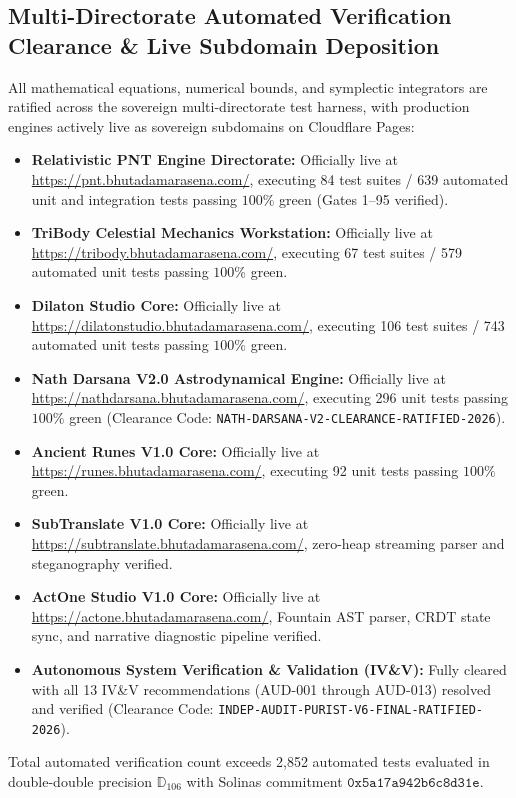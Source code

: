 \documentclass[11pt,a4paper,reqno]{article}
\theoremstyle{plain}
\theoremstyle{definition}
\theoremstyle{remark}
\numberwithin{equation}{section}
\newcommand{\Ddd}{\mathbb{D}_{106}}
\begin{document}
\subsection*{Multi-Directorate Automated Verification Clearance \& Live Subdomain Deposition}
All mathematical equations, numerical bounds, and symplectic integrators are ratified across the sovereign multi-directorate test harness, with production engines actively live as sovereign subdomains on Cloudflare Pages:
\begin{itemize}[leftmargin=2.0em]
  \item \textbf{Relativistic PNT Engine Directorate:} Officially live at \url{https://pnt.bhutadamarasena.com/}, executing 84 test suites / 639 automated unit and integration tests passing $100\%$ green (Gates 1--95 verified).
  \item \textbf{TriBody Celestial Mechanics Workstation:} Officially live at \url{https://tribody.bhutadamarasena.com/}, executing 67 test suites / 579 automated unit tests passing $100\%$ green.
  \item \textbf{Dilaton Studio Core:} Officially live at \url{https://dilatonstudio.bhutadamarasena.com/}, executing 106 test suites / 743 automated unit tests passing $100\%$ green.
  \item \textbf{Nath Darsana V2.0 Astrodynamical Engine:} Officially live at \url{https://nathdarsana.bhutadamarasena.com/}, executing 296 unit tests passing $100\%$ green (Clearance Code: \texttt{NATH-DARSANA-V2-CLEARANCE-RATIFIED-2026}).
  \item \textbf{Ancient Runes V1.0 Core:} Officially live at \url{https://runes.bhutadamarasena.com/}, executing 92 unit tests passing $100\%$ green.
  \item \textbf{SubTranslate V1.0 Core:} Officially live at \url{https://subtranslate.bhutadamarasena.com/}, zero-heap streaming parser and steganography verified.
  \item \textbf{ActOne Studio V1.0 Core:} Officially live at \url{https://actone.bhutadamarasena.com/}, Fountain AST parser, CRDT state sync, and narrative diagnostic pipeline verified.
  \item \textbf{Autonomous System Verification \& Validation (IV\&V):} Fully cleared with all 13 IV\&V recommendations (AUD-001 through AUD-013) resolved and verified (Clearance Code: \texttt{INDEP-AUDIT-PURIST-V6-FINAL-RATIFIED-2026}).
\end{itemize}
Total automated verification count exceeds 2,852 automated tests evaluated in double-double precision $\Ddd$ with Solinas commitment $\mathtt{0x5a17a942b6c8d31e}$.
\end{document}
